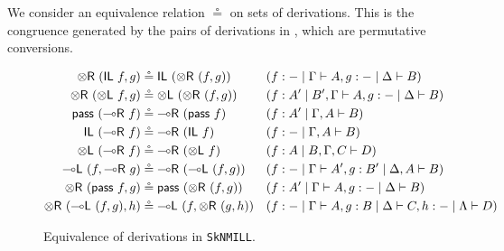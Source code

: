 \documentclass[runningheads]{llncs}
\newcommand{\tl}{\otimes \mathsf{L}}
\newcommand{\tr}{\otimes \mathsf{R}}
\newcommand{\lright}{{\multimap}\mathsf{R}}
\newcommand{\lleft}{{\multimap}\mathsf{L}}
\newcommand{\pass}{\mathsf{pass}}
\newcommand{\unitl}{\mathsf{IL}}
\newcommand{\unitr}{\mathsf{IR}}
\newcommand{\otR}{\tr}
\newcommand{\lolliR}{\lright}
\newcommand{\lolliL}{\lleft}
\newcommand{\ax}{\mathsf{ax}}
\newcommand{\ot}{\otimes}
\newcommand{\lolli}{\multimap}
\newcommand{\I}{\mathsf{I}}
\newcommand{\SkNMILL}{\texttt{SkNMILL}}
\begin{document}
We consider an equivalence relation $\circeq$ on sets of derivations. This is the congruence generated by the pairs of derivations in , which are permutative conversions. %
\begin{figure}[t]
\begin{align*}\small
  \tr \text{ } (\unitl \text{ } f, g) &\circeq \unitl \text{ } (\tr \text{ } (f , g)) &&(f : - \mid \Gamma \vdash A , g : - \mid \Delta \vdash B)
  \\
  \tr \text{ } (\tl \text{ } f, g) &\circeq \tl \text{ } (\tr \text{ } (f , g)) &&(f : A' \mid B' , \Gamma \vdash A , g : - \mid \Delta \vdash B)
  \\
  \pass \text{ } (\lolliR \text{ } f) &\circeq \lolliR \text{ } (\pass \text{ } f) &&(f : A' \mid \Gamma , A \vdash B)
  \\
  \unitl \text{ } (\lolliR \text{ } f) &\circeq \lolliR \text{ } (\unitl \text{ } f) &&(f : - \mid \Gamma , A \vdash B)
  \\
  \tl \text{ } (\lolliR \text{ } f) &\circeq \lolliR \text{ } (\tl \text{ } f) &&(f : A \mid B , \Gamma , C \vdash D)
  \\
  \lleft \text{ } (f, \lolliR \text{ } g) &\circeq \lolliR \text{ } (\lleft \text{ } (f, g)) &&(f : - \mid \Gamma \vdash A', g : B' \mid \Delta , A \vdash B)
  \\%
  \tr \text{ } (\pass \text{ } f, g) &\circeq \pass \text{ } (\tr \text{ } (f, g)) &&(f : A' \mid \Gamma \vdash A, g : - \mid \Delta \vdash B)
  \\
  \tr \text{ } (\lleft \text{ } (f , g), h) & \circeq \lleft \text{ } (f, \tr \text{ } (g, h)) &&(f: - \mid \Gamma \vdash A, g : B \mid \Delta \vdash C, h : - \mid \Lambda \vdash D)
\end{align*}
\caption{Equivalence of derivations in \SkNMILL.}
\label{fig:circeq}
\end{figure}
\end{document}
